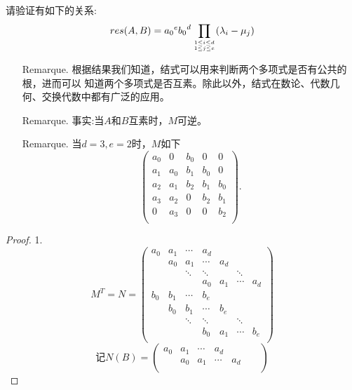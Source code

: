\documentclass{article}
\begin{document}
\begin{enumerate}
    请验证有如下的关系:\[res (A, B)={a_0}^e {b_0}^d \prod\limits_{1\leq i\leq d \atop 1\leq j\leq e}(\lambda_i -\mu_j)\]
    \begin{enumerate}
        \item [Remarque.]根据结果我们知道，结式可以用来判断两个多项式是否有公共的根，进而可以
        知道两个多项式是否互素。除此以外，结式在数论、代数几何、交换代数中都有广泛的应用。
        \item [Remarque.]事实:当$A$和$B$互素时，$M$可逆。
        \item [Remarque.]当$d=3,e=2$时，$M$如下
        \[
            \begin{pmatrix}
                a_0 &   0 & b_0 &   0 &  0\\
                a_1 & a_0 & b_1 & b_0 &  0\\
                a_2 & a_1 & b_2 & b_1 &  b_0\\
                a_3 & a_2 & 0   & b_2 &  b_1\\
                0   & a_3 & 0   & 0   &  b_2\\
            \end{pmatrix}.
        \]
    \end{enumerate}
    \begin{proof}1.
    \[
        M^T=N=
        \begin{pmatrix}
            a_0 & a_1 & \cdots &    a_d &     &        &     \\
                & a_0 &    a_1 & \cdots & a_d &        &     \\
                &     & \ddots & \ddots &     & \ddots &     \\
                &     &        &    a_0 & a_1 & \cdots & a_d \\
            b_0 & b_1 & \cdots &    b_e &     &        &     \\
                & b_0 &    b_1 & \cdots & b_e &        &     \\
                &     & \ddots & \ddots &     & \ddots &     \\
                &     &        &    b_0 & a_1 & \cdots & b_e \\
        \end{pmatrix}
    \]
    \[
        \mbox{记}
        N(B)=
        \begin{pmatrix}
            a_0 & a_1 & \cdots &    a_d &       &        &     \\
                & a_0 &    a_1 & \cdots & a_d   &        &     \\

\end{pmatrix}\]
\end{proof}
\end{enumerate}
\end{document}
